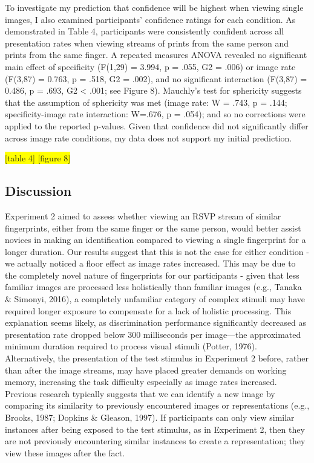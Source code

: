 \documentclass[
  english,
  man]{apa6}
\begin{document}
To investigate my prediction that confidence will be highest when viewing single images, I also examined participants' confidence ratings for each condition. As demonstrated in Table 4, participants were consistently confident across all presentation rates when viewing streams of prints from the same person and prints from the same finger. A repeated measures ANOVA revealed no significant main effect of specificity (F(1,29) = 3.994, p = .055, G2 = .006) or image rate (F(3,87) = 0.763, p = .518, G2 = .002), and no significant interaction (F(3,87) = 0.486, p = .693, G2 \textless{} .001; see Figure 8). Mauchly's test for sphericity suggests that the assumption of sphericity was met (image rate: W = .743, p = .144; specificity-image rate interaction: W=.676, p = .054); and so no corrections were applied to the reported p-values. Given that confidence did not significantly differ across image rate conditions, my data does not support my initial prediction.

\colorbox{yellow}{[table 4]
[figure 8]}

\hypertarget{discussion-1}{%
\subsection{Discussion}\label{discussion-1}}

Experiment 2 aimed to assess whether viewing an RSVP stream of similar fingerprints, either from the same finger or the same person, would better assist novices in making an identification compared to viewing a single fingerprint for a longer duration. Our results suggest that this is not the case for either condition - we actually noticed a floor effect as image rates increased. This may be due to the completely novel nature of fingerprints for our participants - given that less familiar images are processed less holistically than familiar images (e.g., Tanaka \& Simonyi, 2016), a completely unfamiliar category of complex stimuli may have required longer exposure to compensate for a lack of holistic processing. This explanation seems likely, as discrimination performance significantly decreased as presentation rate dropped below 300 milliseconds per image---the approximated minimum duration required to process visual stimuli (Potter, 1976). Alternatively, the presentation of the test stimulus in Experiment 2 before, rather than after the image streams, may have placed greater demands on working memory, increasing the task difficulty especially as image rates increased. Previous research typically suggests that we can identify a new image by comparing its similarity to previously encountered images or representations (e.g., Brooks, 1987; Dopkins \& Gleason, 1997). If participants can only view similar instances after being exposed to the test stimulus, as in Experiment 2, then they are not previously encountering similar instances to create a representation; they view these images after the fact.
\end{document}
